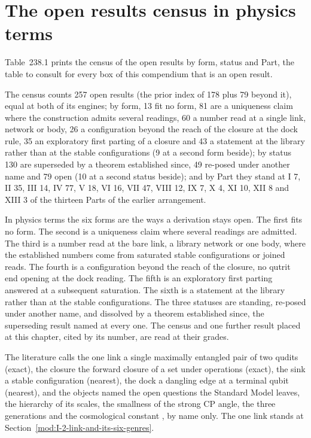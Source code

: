 \section{The open results census in physics terms}\label{mod:XIV-2-walls-census-in-physics-terms}
\label{narr:open:14-2}Table~238.1 prints the census of the open results by form, status and Part, the table to consult for every box of this compendium that is an open result.
\begin{chtable}\label{box:XIV-2-walls-census-in-physics-terms:1}
The census counts 257 open results (the prior index of 178 plus 79 beyond it), equal at both of its engines; by form, 13 fit no form, 81 are a uniqueness claim where the construction admits several readings, 60 a number read at a single link, network or body, 26 a configuration beyond the reach of the closure at the dock rule, 35 an exploratory first parting of a closure and 43 a statement at the library rather than at the stable configurations (9 at a second form beside); by status 130 are superseded by a theorem established since, 49 re-posed under another name and 79 open (10 at a second status beside); and by Part they stand at I 7, II 35, III 14, IV 77, V 18, VI 16, VII 47, VIII 12, IX 7, X 4, XI 10, XII 8 and XIII 3 of the thirteen Parts of the earlier arrangement.
\end{chtable}
In physics terms the six forms are the ways a derivation stays open. The first fits no form. The second is a uniqueness claim where several readings are admitted. The third is a number read at the bare link, a library network or one body, where the established numbers come from saturated stable configurations or joined reads. The fourth is a configuration beyond the reach of the closure, no qutrit end opening at the dock reading. The fifth is an exploratory first parting answered at a subsequent saturation. The sixth is a statement at the library rather than at the stable configurations. The three statuses are standing, re-posed under another name, and dissolved by a theorem established since, the superseding result named at every one. The census and one further result placed at this chapter, cited by its number, are read at their grades.
\begin{chbridge}
The literature calls the one link a single maximally entangled pair of two qudits (exact), the closure the forward closure of a set under operations (exact), the sink a stable configuration (nearest), the dock a dangling edge at a terminal qubit (nearest), and the objects named the open questions the Standard Model leaves, the hierarchy of its scales, the smallness of the strong CP angle, the three generations and the cosmological constant \cite{Weinberg1996,Navas2024}, by name only. The one link stands at Section~\ref{mod:I-2-link-and-its-six-genres}.
\end{chbridge}
